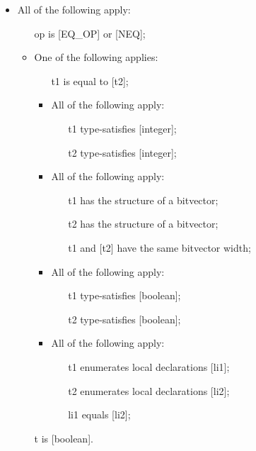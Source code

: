 \documentclass{book}
\begin{document}
\begin{itemize}
  \item  All of the following apply:
    \begin{itemize}
    \item  [op] is [EQ\_OP] or [NEQ];
    \item  One of the following applies:
      \begin{itemize}
      \item  [t1] is equal to [t2];
      \item  All of the following apply:
        \begin{itemize}
        \item  [t1] type-satisfies [integer];
        \item  [t2] type-satisfies [integer]; 
        \end{itemize}
      \item  All of the following apply:
        \begin{itemize}
        \item  [t1] has the structure of a bitvector;
        \item  [t2] has the structure of a bitvector;
        \item  [t1] and [t2] have the same bitvector width;
        \end{itemize}
      \item  All of the following apply:
        \begin{itemize}
        \item  [t1] type-satisfies [boolean];
        \item  [t2] type-satisfies [boolean];
        \end{itemize}
      \item  All of the following apply:
        \begin{itemize}
        \item  [t1] enumerates local declarations [li1]; 
        \item  [t2] enumerates local declarations [li2];
        \item  [li1] equals [li2];
        \end{itemize}
      \end{itemize}
    \item  [t] is [boolean].
    \end{itemize}
   

\end{itemize}
\end{document}
